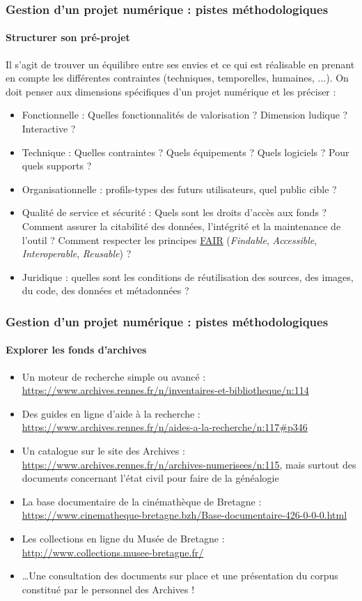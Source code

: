 \documentclass[xcolor=table]{beamer}
\begin{document}
\begin{frame}[allowframebreaks]
\frametitle{Gestion d'un projet num\'erique : pistes m\'ethodologiques}
\framesubtitle{Structurer son pr\'e-projet}
Il s'agit de trouver un \'equilibre entre ses envies et ce qui est r\'ealisable en prenant en compte les diff\'erentes contraintes (techniques, temporelles, humaines, ...). On doit penser aux dimensions sp\'ecifiques d'un projet num\'erique et les pr\'eciser :
\begin{itemize}
    \item Fonctionnelle : Quelles fonctionnalit\'es de valorisation ? Dimension ludique ? Interactive ?
    \item Technique : Quelles contraintes ? Quels \'equipements ? Quels logiciels ? Pour quels supports ? 
    \item Organisationnelle : profils-types des futurs utilisateurs, quel public cible ?
    \item Qualit\'e de service et s\'ecurit\'e : Quels sont les droits d'acc\`es aux fonds ? Comment assurer la citabilit\'e des donn\'ees, l'int\'egrit\'e et la maintenance de l'outil ? Comment respecter les principes \href{https://doranum.fr/enjeux-benefices/principes-fair/}{FAIR} (\textit{Findable}, \textit{Accessible}, \textit{Interoperable}, \textit{Reusable}) ?
    \item Juridique : quelles sont les conditions de r\'eutilisation des sources, des images, du code, des donn\'ees et m\'etadonn\'ees ?
\end{itemize}
\end{frame}

\begin{frame}[allowframebreaks]
\frametitle{Gestion d'un projet num\'erique : pistes m\'ethodologiques}
\framesubtitle{Explorer les fonds d'archives}
\begin{itemize}
    \item Un moteur de recherche simple ou avanc\'e : \url{https://www.archives.rennes.fr/n/inventaires-et-bibliotheque/n:114}
    \item Des guides en ligne d'aide \`a la recherche : \url{https://www.archives.rennes.fr/n/aides-a-la-recherche/n:117#p346}
    \item Un catalogue sur le site des Archives : \url{https://www.archives.rennes.fr/n/archives-numerisees/n:115}, mais surtout des documents concernant l'\'etat civil pour faire de la g\'en\'ealogie
    \item La base documentaire de la cin\'emath\`eque de Bretagne : \url{https://www.cinematheque-bretagne.bzh/Base-documentaire-426-0-0-0.html}
    \item Les collections en ligne du Mus\'ee de Bretagne : \url{http://www.collections.musee-bretagne.fr/}
    \item \ldots Une consultation des documents sur place et une pr\'esentation du corpus constitu\'e par le personnel des Archives !
\end{itemize}
\end{frame}
\end{document}
